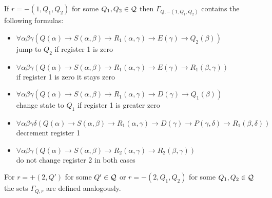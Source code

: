 If $r=-(1,Q_1,Q_2)$ for some $Q_1,Q_2\in\mathcal{Q}$ then $\Gamma_{Q,-(1,Q_1,Q_2)}$ contains the following formulas:
\begin{itemize}
	\item $\forall\alpha\beta\gamma(Q(\alpha)\to S(\alpha,\beta)\to R_1(\alpha,\gamma)\to E(\gamma)\to Q_2(\beta))$\\jump to $Q_2$ if register 1 is zero
	\item $\forall\alpha\beta\gamma(Q(\alpha)\to S(\alpha,\beta)\to R_1(\alpha,\gamma)\to E(\gamma)\to R_1(\beta,\gamma))$\\if register 1 is zero it stays zero
	\item $\forall\alpha\beta\gamma(Q(\alpha)\to S(\alpha,\beta)\to R_1(\alpha,\gamma)\to D(\gamma)\to Q_1(\beta))$\\change state to $Q_1$ if register 1 is greater zero
	\item $\forall\alpha\beta\gamma\delta(Q(\alpha)\to S(\alpha,\beta)\to R_1(\alpha,\gamma)\to D(\gamma) \to P(\gamma,\delta)\to R_1(\beta,\delta))$\\decrement register 1
	\item $\forall\alpha\beta\gamma(Q(\alpha)\to S(\alpha,\beta)\to R_2(\alpha,\gamma)\to R_2(\beta,\gamma))$\\do not change register 2 in both cases
\end{itemize}

For $r=+(2,Q')$ for some $Q'\in\mathcal{Q}$ or $r=-(2,Q_1,Q_2)$ for some $Q_1,Q_2\in\mathcal{Q}$ the sets $\Gamma_{Q,r}$ are defined analogously.


